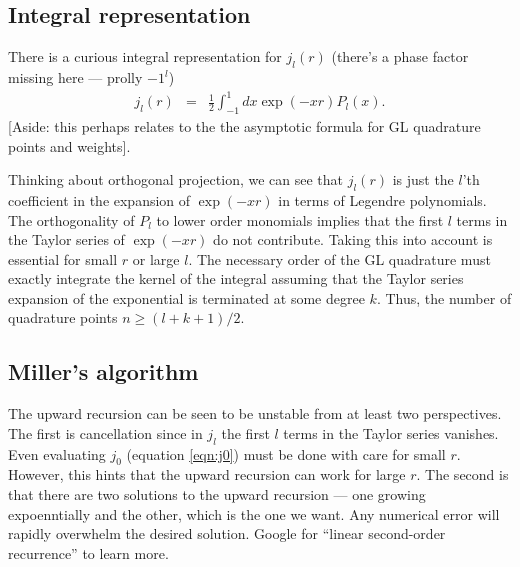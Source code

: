 \documentclass[12pt]{article}
\begin{document}
\subsection{Integral representation}

There is a curious integral representation for $j_l(r)$ (there's a phase factor missing here --- prolly $-1^l$)
\begin{eqnarray}
  j_l(r) & = & \frac{1}{2} \int_{-1}^1 dx \exp(-xr) P_l(x) .
\end{eqnarray}
[Aside: this perhaps relates to the the asymptotic formula for GL quadrature points and weights].
    
Thinking about orthogonal projection, we can see that $j_l(r)$ is just the $l$'th coefficient in the expansion of $\exp(-xr)$ in terms of Legendre polynomials.  The orthogonality of $P_l$ to lower order monomials implies that the first $l$ terms in the Taylor series of $\exp(-xr)$ do not contribute.  Taking this into account is essential for small $r$ or large $l$.  The necessary order of the GL quadrature must exactly integrate the kernel of the integral assuming that the Taylor series expansion of the exponential is terminated at some degree $k$.  Thus, the number of quadrature points $n \ge (l+k+1)/2$.

\subsection{Miller's algorithm}

The upward recursion can be seen to be unstable from at least two perspectives.  The first is cancellation since in $j_l$ the first $l$ terms in the Taylor series vanishes.  Even evaluating $j_0$ (equation \ref{eqn:j0}) must be done with care for small $r$. However, this hints that the upward recursion can work for large $r$.   The second is that there are two solutions to the upward recursion --- one growing expoenntially and the other, which is the one we want. Any numerical error will rapidly overwhelm the desired solution.  Google for ``linear second-order recurrence'' to learn more.
\end{document}
